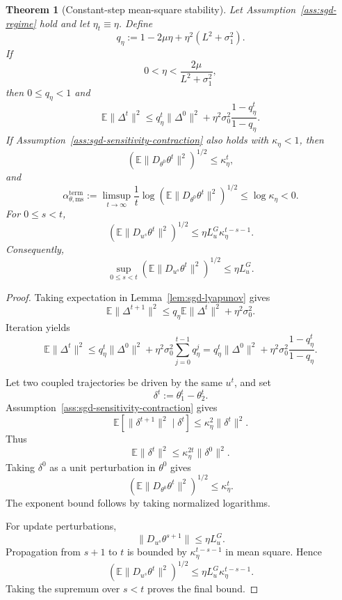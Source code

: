 \documentclass{article}
\newtheorem{theorem}{Theorem}[section]
\numberwithin{equation}{section}
\begin{document}
\begin{theorem}[Constant-step mean-square stability]
\label{thm:sgd-constant-stepsize}
Let Assumption~\ref{ass:sgd-regime} hold and let \(\eta_t\equiv\eta\). Define
\[
q_\eta:=1-2\mu\eta+\eta^2(L^2+\sigma_1^2).
\]
If
\[
0<\eta<\frac{2\mu}{L^2+\sigma_1^2},
\]
then \(0\le q_\eta<1\) and
\[
\mathbb{E}\|\Delta^t\|^2
\le
q_\eta^t\|\Delta^0\|^2
+
\eta^2\sigma_0^2\frac{1-q_\eta^t}{1-q_\eta}.
\]
If Assumption~\ref{ass:sgd-sensitivity-contraction} also holds with
\(\kappa_\eta<1\), then
\[
\left(
\mathbb{E}\|D_{\theta^0}\theta^t\|^2
\right)^{1/2}
\le
\kappa_\eta^t ,
\]
and
\[
\alpha_{\theta,\mathrm{ms}}^{\mathrm{term}}
:=
\limsup_{t\to\infty}
\frac1t
\log
\left(
\mathbb{E}\|D_{\theta^0}\theta^t\|^2
\right)^{1/2}
\le
\log\kappa_\eta<0 .
\]
For \(0\le s<t\),
\[
\left(
\mathbb{E}\|D_{u^s}\theta^t\|^2
\right)^{1/2}
\le
\eta L_u^G\kappa_\eta^{t-s-1}.
\]
Consequently,
\[
\sup_{0\le s<t}
\left(
\mathbb{E}\|D_{u^s}\theta^t\|^2
\right)^{1/2}
\le
\eta L_u^G .
\]
\end{theorem}

\begin{proof}
Taking expectation in Lemma~\ref{lem:sgd-lyapunov} gives
\[
\mathbb{E}\|\Delta^{t+1}\|^2
\le
q_\eta\mathbb{E}\|\Delta^t\|^2+\eta^2\sigma_0^2 .
\]
Iteration yields
\[
\mathbb{E}\|\Delta^t\|^2
\le
q_\eta^t\|\Delta^0\|^2
+
\eta^2\sigma_0^2\sum_{j=0}^{t-1}q_\eta^j
=
q_\eta^t\|\Delta^0\|^2
+
\eta^2\sigma_0^2\frac{1-q_\eta^t}{1-q_\eta}.
\]

Let two coupled trajectories be driven by the same \(u^t\), and set
\[
\delta^t:=\theta_1^t-\theta_2^t .
\]
Assumption~\ref{ass:sgd-sensitivity-contraction} gives
\[
\mathbb{E}[\|\delta^{t+1}\|^2\mid \delta^t]
\le
\kappa_\eta^2\|\delta^t\|^2 .
\]
Thus
\[
\mathbb{E}\|\delta^t\|^2
\le
\kappa_\eta^{2t}\|\delta^0\|^2 .
\]
Taking \(\delta^0\) as a unit perturbation in \(\theta^0\) gives
\[
\left(
\mathbb{E}\|D_{\theta^0}\theta^t\|^2
\right)^{1/2}
\le
\kappa_\eta^t .
\]
The exponent bound follows by taking normalized logarithms.

For update perturbations,
\[
\|D_{u^s}\theta^{s+1}\|\le \eta L_u^G .
\]
Propagation from \(s+1\) to \(t\) is bounded by
\(\kappa_\eta^{t-s-1}\) in mean square. Hence
\[
\left(
\mathbb{E}\|D_{u^s}\theta^t\|^2
\right)^{1/2}
\le
\eta L_u^G\kappa_\eta^{t-s-1}.
\]
Taking the supremum over \(s<t\) proves the final bound.
\end{proof}
\end{document}
